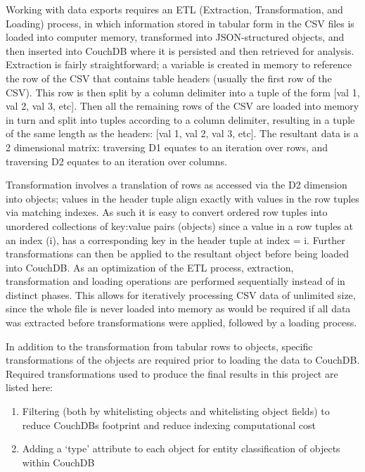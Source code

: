 Working with data exports requires an ETL (Extraction, Transformation, and Loading) process, in which information stored in tabular form in the CSV files is loaded into computer memory, transformed into JSON-structured objects, and then inserted into CouchDB where it is persisted and then retrieved for analysis. Extraction is fairly straightforward; a variable is created in memory to reference the row of the CSV that contains table headers (usually the first row of the CSV). This row is then split by a column delimiter into a tuple of the form [val 1, val 2, val 3, etc]. Then all the remaining rows of the CSV are loaded into memory in turn and split into tuples according to a column delimiter, resulting in a tuple of the same length as the headers: [val 1, val 2, val 3, etc]. The resultant data is a 2 dimensional matrix: traversing D1 equates to an iteration over rows, and traversing D2 equates to an iteration over columns.

Transformation involves a translation of rows as accessed via the D2 dimension into objects; values in the header tuple align exactly with values in the row tuples via matching indexes. As such it is easy to convert ordered row tuples into unordered collections of key:value pairs (objects) since a value in a row tuples at an index (i), has a corresponding key in the header tuple at index = i. Further transformations can then be applied to the resultant object before being loaded into CouchDB. As an optimization of the ETL process, extraction, transformation and loading operations are performed sequentially instead of in distinct phases. This allows for iteratively processing CSV data of unlimited size, since the whole file is never loaded into memory as would be required if all data was extracted before transformations were applied, followed by a loading process.

In addition to the transformation from tabular rows to objects, specific transformations of the objects are required prior to loading the data to CouchDB. Required transformations used to produce the final results in this project are listed here:

\begin{enumerate}
    \item Filtering (both by whitelisting objects and whitelisting object fields) to reduce CouchDBs footprint and reduce indexing computational cost
    \item Adding a `type' attribute to each object for entity classification of objects within CouchDB
\end{enumerate}

